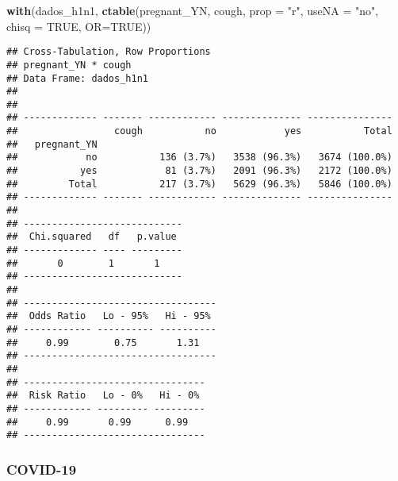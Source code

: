 \documentclass[
]{article}
\newenvironment{Shaded}{\begin{snugshade}}{\end{snugshade}}
\newcommand{\DataTypeTok}[1]{\textcolor[rgb]{0.13,0.29,0.53}{#1}}
\newcommand{\DecValTok}[1]{\textcolor[rgb]{0.00,0.00,0.81}{#1}}
\newcommand{\KeywordTok}[1]{\textcolor[rgb]{0.13,0.29,0.53}{\textbf{#1}}}
\newcommand{\NormalTok}[1]{#1}
\newcommand{\OperatorTok}[1]{\textcolor[rgb]{0.81,0.36,0.00}{\textbf{#1}}}
\newcommand{\OtherTok}[1]{\textcolor[rgb]{0.56,0.35,0.01}{#1}}
\newcommand{\StringTok}[1]{\textcolor[rgb]{0.31,0.60,0.02}{#1}}
\begin{document}
\begin{Shaded}
\begin{Highlighting}[]
\KeywordTok{with}\NormalTok{(dados_h1n1, }\KeywordTok{ctable}\NormalTok{(pregnant_YN, cough, }\DataTypeTok{prop =} \StringTok{"r"}\NormalTok{, }\DataTypeTok{useNA =} \StringTok{"no"}\NormalTok{, }\DataTypeTok{chisq =} \OtherTok{TRUE}\NormalTok{, }\DataTypeTok{OR=}\OtherTok{TRUE}\NormalTok{))}
\end{Highlighting}
\end{Shaded}

\begin{verbatim}
## Cross-Tabulation, Row Proportions  
## pregnant_YN * cough  
## Data Frame: dados_h1n1  
## 
## 
## ------------- ------- ------------ -------------- ---------------
##                 cough           no            yes           Total
##   pregnant_YN                                                    
##            no           136 (3.7%)   3538 (96.3%)   3674 (100.0%)
##           yes            81 (3.7%)   2091 (96.3%)   2172 (100.0%)
##         Total           217 (3.7%)   5629 (96.3%)   5846 (100.0%)
## ------------- ------- ------------ -------------- ---------------
## 
## ----------------------------
##  Chi.squared   df   p.value 
## ------------- ---- ---------
##       0        1       1    
## ----------------------------
## 
## ----------------------------------
##  Odds Ratio   Lo - 95%   Hi - 95% 
## ------------ ---------- ----------
##     0.99        0.75       1.31   
## ----------------------------------
## 
## --------------------------------
##  Risk Ratio   Lo - 0%   Hi - 0% 
## ------------ --------- ---------
##     0.99       0.99      0.99   
## --------------------------------
\end{verbatim}

\hypertarget{covid-19-12}{%
\subsubsection{COVID-19}\label{covid-19-12}}

\begin{Shaded}
\end{Shaded}
\end{document}
